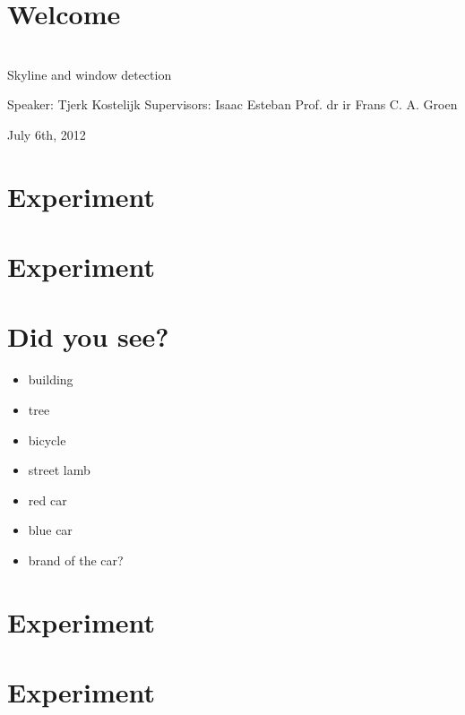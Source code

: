 

\section{Welcome}

{\LARGE {}\\Skyline and window detection}

Speaker: Tjerk Kostelijk
Supervisors:
Isaac Esteban
Prof. dr ir Frans C. A. Groen


July 6th, 2012

\section{Experiment}


\section{Experiment}


\section{Did you see?}
\begin{itemize}
	\item building
	\item tree
	\item bicycle
	\item street lamb
	\item red car
	\item blue car
	\item brand of the car?
\end{itemize}


\section{Experiment}
\section{Experiment}


